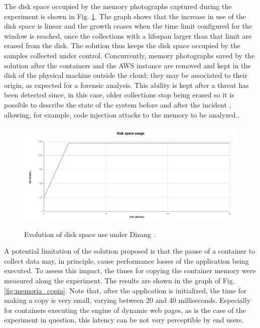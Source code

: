 \documentclass[conference]{IEEEtran}
\newcommand{\fancyname}{Dizang }
\begin{document}
The disk space occupied by the memory photographs captured during the experiment is shown in Fig. \ref{fig:evolucao_coleta}. 
%
The graph shows that the increase in use of the disk space is linear and the growth ceases when the time limit configured for the window is reached, once the collections with a lifespan larger than that limit are erased from the disk. 
%
The solution thus keeps the disk space occupied by the samples collected under control.
%
Concurrently, memory photographs saved by the solution after the containers and the AWS instance are removed and kept in the disk of the physical machine outside the cloud; they may be associated to their origin, as expected for a forensic analysis. 
%
This ability is kept after a threat has been detected since, in this case, older collections stop being erased so it is possible to describe the state of the system before and after the incident \cite{Case_Memory_Forensics:2014}, allowing, for example, code injection attacks to the memory to be analyzed..


\begin{figure}[h!]
\footnotesize
\caption{Evolution of disk space use under \fancyname.}
\includegraphics[scale=0.42]{evolucao_coleta_ieee.png}
\centering
\label{fig:evolucao_coleta}
\end{figure}


A potential limitation of the solution proposed is that the pause of a container to collect data may, in principle, cause performance losses of the application being executed. 
%
To assess this impact, the times for copying the container memory were measured along the experiment.
%
The results are shown in the graph of Fig. \ref{fig:memoria_copia}.
%
Note that, after the application is initialized, the time for making a copy is very small, varying between 20 and 40 milliseconds. 
%
Especially for containers executing the engine of dynamic web pages, as is the case of the experiment in question, this latency can be not very perceptible by end users.
\end{document}
